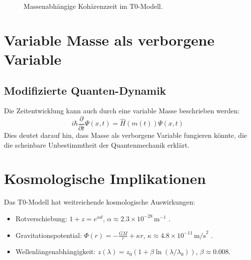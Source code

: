\documentclass{article}
\begin{document}
	\begin{figure}[h]
		\centering
		\caption{Massenabhängige Kohärenzzeit im T0-Modell.}
	\end{figure}
	
	\section{Variable Masse als verborgene Variable}
	\subsection{Modifizierte Quanten-Dynamik}
	Die Zeitentwicklung kann auch durch eine variable Masse beschrieben werden:
	\begin{equation}
		i\hbar \frac{\partial}{\partial t}\Psi(x,t) = \hat{H}(m(t))\Psi(x,t)
	\end{equation}
	Dies deutet darauf hin, dass Masse als verborgene Variable fungieren könnte, die die scheinbare Unbestimmtheit der Quantenmechanik erklärt.
	
	\section{Kosmologische Implikationen}
	Das T0-Modell hat weitreichende kosmologische Auswirkungen:
	\begin{itemize}
		\item Rotverschiebung: \( 1 + z = e^{\alpha d} \), \( \alpha \approx 2.3 \times 10^{-28} \, \text{m}^{-1} \) \cite{wesentlicheFormalismen}.
		\item Gravitationspotential: \( \Phi(r) = -\frac{GM}{r} + \kappa r \), \( \kappa \approx 4.8 \times 10^{-11} \, \text{m/s}^2 \) \cite{wesentlicheFormalismen}.
		\item Wellenlängenabhängigkeit: \( z(\lambda) = z_0 (1 + \beta \ln(\lambda/\lambda_0)) \), \( \beta \approx 0.008 \).
	\end{itemize}
	
\end{document}
